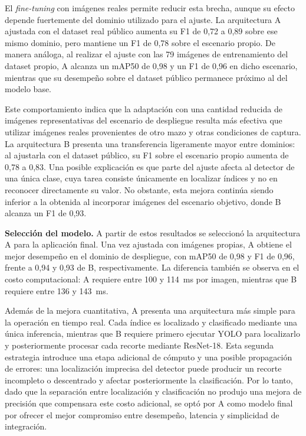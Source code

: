 \documentclass[conference,a4paper]{IEEEtran}
\begin{document}
El \textit{fine-tuning} con imágenes reales permite reducir esta brecha, aunque su efecto depende fuertemente del dominio utilizado para el ajuste. La arquitectura A ajustada con el dataset real público aumenta su F1 de 0,72 a 0,89 sobre ese mismo dominio, pero mantiene un F1 de 0,78 sobre el escenario propio. De manera análoga, al realizar el ajuste con las 79 imágenes de entrenamiento del dataset propio, A alcanza un mAP50 de 0,98 y un F1 de 0,96 en dicho escenario, mientras que su desempeño sobre el dataset público permanece próximo al del modelo base.

Este comportamiento indica que la adaptación con una cantidad reducida de imágenes representativas del escenario de despliegue resulta más efectiva que utilizar imágenes reales provenientes de otro mazo y otras condiciones de captura. La arquitectura B presenta una transferencia ligeramente mayor entre dominios: al ajustarla con el dataset público, su F1 sobre el escenario propio aumenta de 0,78 a 0,83. Una posible explicación es que parte del ajuste afecta al detector de una única clase, cuya tarea consiste únicamente en localizar índices y no en reconocer directamente su valor. No obstante, esta mejora continúa siendo inferior a la obtenida al incorporar imágenes del escenario objetivo, donde B alcanza un F1 de 0,93.

\textbf{Selección del modelo.} A partir de estos resultados se seleccionó la arquitectura A para la aplicación final. Una vez ajustada con imágenes propias, A obtiene el mejor desempeño en el dominio de despliegue, con mAP50 de 0,98 y F1 de 0,96, frente a 0,94 y 0,93 de B, respectivamente. La diferencia también se observa en el costo computacional: A requiere entre 100 y 114~ms por imagen, mientras que B requiere entre 136 y 143~ms.

Además de la mejora cuantitativa, A presenta una arquitectura más simple para la operación en tiempo real. Cada índice es localizado y clasificado mediante una única inferencia, mientras que B requiere primero ejecutar YOLO para localizarlo y posteriormente procesar cada recorte mediante ResNet-18. Esta segunda estrategia introduce una etapa adicional de cómputo y una posible propagación de errores: una localización imprecisa del detector puede producir un recorte incompleto o descentrado y afectar posteriormente la clasificación. Por lo tanto, dado que la separación entre localización y clasificación no produjo una mejora de precisión que compensara este costo adicional, se optó por A como modelo final por ofrecer el mejor compromiso entre desempeño, latencia y simplicidad de integración.
\end{document}
